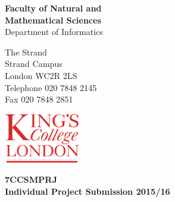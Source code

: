 \documentclass[11pt,titlepage]{report}
\begin{document}
\lstset{basicstyle=\ttfamily, breaklines=true}
\setlength{\parindent}{1cm}
\setlength{\parskip}{0.25cm}


\begin{titlepage}
\begin{minipage}{0.5\textwidth}
\begin{flushleft}
\textbf{Faculty of Natural and\\Mathematical Sciences\\}
\small{Department of Informatics}
\end{flushleft}
\end{minipage}
\begin{minipage}{0.25\textwidth}
\begin{flushleft}
\scriptsize{The Strand\\Strand Campus\\London WC2R 2LS\\Telephone 020 7848 2145\\Fax 020 7848 2851}
\end{flushleft}
\end{minipage}
\begin{minipage}{0.25\textwidth}
\begin{flushright}
\includegraphics[width=3.25cm]{img/kcl}
\end{flushright}
\end{minipage}
\begin{minipage}{\textwidth}
\vspace{1.5cm}
\begin{center}
\textbf{7CCSMPRJ \\ Individual Project Submission 2015/16}
\end{center}
\vspace{1cm}
\end{minipage}
\begin{minipage}{0.3\textwidth}
	\begin{flushleft}
		\doublespacing

\end{flushleft}
\end{minipage}
\end{titlepage}
\end{document}
